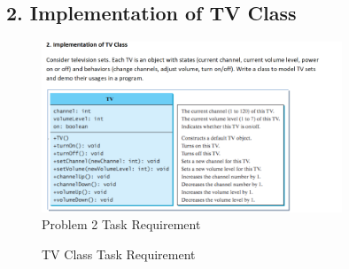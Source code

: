 \documentclass{article}
\begin{document}
\subsection*{2. Implementation of TV Class}
\begin{figure}[H]
    \centering
    \includegraphics[width=0.8\textwidth]{./Assets/Task requirements/Assignment6/2.png}
    
    \caption{Problem 2 Task Requirement}
\end{figure}

\begin{figure}[h]
    \centering
    \caption{TV Class Task Requirement}
\end{figure}
\end{document}
